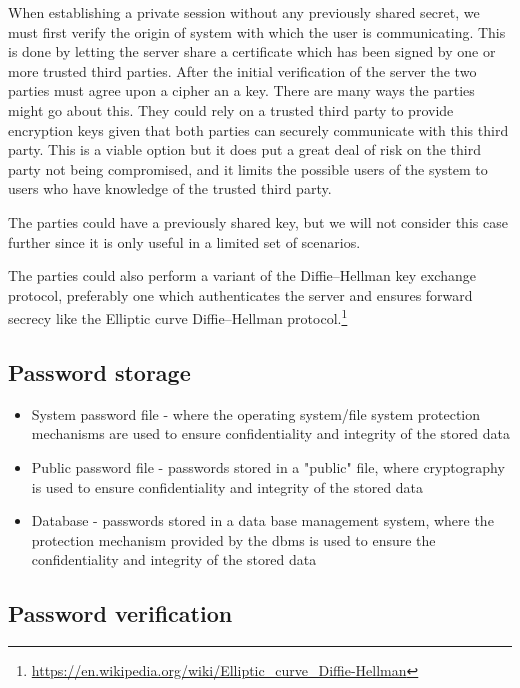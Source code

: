 \documentclass[12pt]{article}
\begin{document}
When establishing a private session without any previously shared secret, we must first verify the origin of system with which the user is communicating. This is done by letting the server share a certificate which has been signed by one or more trusted third parties.
After the initial verification of the server the two parties must agree upon a cipher an a key. There are many ways the parties might go about this.
They could rely on a trusted third party to provide encryption keys given that both parties can securely communicate with this third party. This is a viable option but it does put a great deal of risk on the third party not being compromised, and it limits the possible users of the system to users who have knowledge of the trusted third party.

The parties could have a previously shared key, but we will not consider this case further since it is only useful in a limited set of scenarios.

The parties could also perform a variant of the Diffie–Hellman key exchange protocol, preferably one which authenticates the server and ensures forward secrecy like the Elliptic curve Diffie–Hellman protocol.\footnote{\url{https://en.wikipedia.org/wiki/Elliptic_curve_Diffie-Hellman}}

\subsection{Password storage}
\label{sub:Password storage}

\begin{itemize}
    \item System password file - where the operating system/file system protection mechanisms are used to ensure confidentiality and integrity of the stored data
    \item Public password file - passwords stored in a "public" file, where cryptography is used to ensure confidentiality and integrity of the stored data
    \item Database - passwords stored in a data base management system, where the protection mechanism provided by the dbms is used to ensure the confidentiality and integrity of the stored data
\end{itemize}

\subsection{Password verification}
\label{sub:Password verification}
\end{document}
